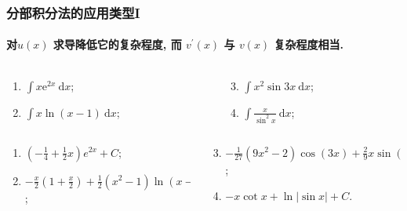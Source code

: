 \documentclass[
10pt,
aspectratio=43,
]{beamer}
\begin{document}
\begin{frame}
	\frametitle{分部积分法的应用类型I}
	\framesubtitle{对$u(x)$ 求导降低它的复杂程度, 而 $v^{\prime}(x)$ 与 $v(x)$ 复杂程度相当. }
	\everymath{\displaystyle}
	\begin{block}{}
		\begin{columns}[onlytextwidth]
			\begin{column}{0.5\textwidth}
				\begin{enumerate}
					\item $\int x \mathrm{e}^{2 x} \mathrm{~d} x$;
					\item $\int x \ln (x-1) \mathrm{~d} x$;
				\end{enumerate}
			\end{column}
			\begin{column}{0.5\textwidth}
				\begin{enumerate}
					\setcounter{enumi}{2}
					\item $\int x^2 \sin 3 x \mathrm{~d} x$;
					\item $\int \frac{x}{\sin ^2 x} \mathrm{~d} x$;
				\end{enumerate}
			\end{column}
		\end{columns}
	\end{block}
	\pause
	\begin{exampleblock}{}
		\begin{columns}[onlytextwidth]
			\begin{column}{0.5\textwidth}
				\begin{enumerate}
					\pause \item $\left(-\frac{1}{4}+\frac{1}{2}x\right)e^{2x}+C$;
					      \pause \item $-\frac{x}{2}\left(1+\frac{x}{2}\right)+\frac{1}{2}\left(x^2-1\right)\ln(x-1)+C$;
				\end{enumerate}
			\end{column}
			\begin{column}{0.5\textwidth}
				\begin{enumerate}
					\setcounter{enumi}{2}
					\pause \item $-\frac{1}{27} \left(9 x^2-2\right) \cos (3 x)+\frac{2}{9} x \sin (3 x)+C$;
					      \pause \item $-x\cot x+\ln|\sin x|+C$.
				\end{enumerate}
			\end{column}
		\end{columns}
	\end{exampleblock}
\end{frame}
\end{document}
